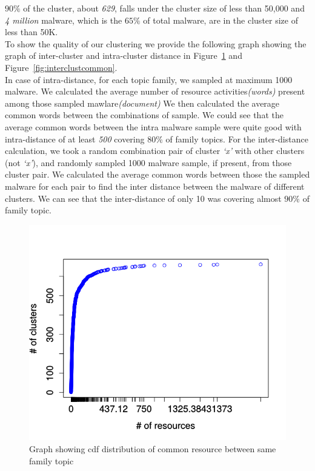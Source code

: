 $90\%$ of the cluster, about \emph{629}, falls under the cluster size of less than 50,000 and \emph{4 million} malware, which is the $65\%$ of total malware, are in the cluster size of less than 50K.\\
To show the quality of our clustering we provide the following graph showing the graph of inter-cluster and intra-cluster distance in Figure~\ref{fig:intraclustcommon} and Figure~\ref{fig:interclustcommon}.\\
In case of intra-distance, for each topic family, we sampled at maximum 1000 malware.
We calculated the average number of resource activities\textit{(words)} present among those sampled mawlare\textit{(document)}
We then calculated the average common words between the combinations of sample.
We could see that the average common words between the intra malware sample were quite good with intra-distance of at least \emph{500} covering $80\%$ of family topics.
For the inter-distance calculation, we took a random combination pair of cluster \emph{`x'} with other clusters (not \emph{`x'}), and randomly sampled 1000 malware sample, if present, from those cluster pair.
We calculated the average common words between those the sampled malware for each pair to find the inter distance between the malware of different clusters.
We can see that the inter-distance of only 10 was covering almost $90\%$ of family topic.
\begin{figure}[htbp]
\begin{center}
  \includegraphics[scale=0.7]{figures/intra_clustered_common.png}
\end{center}
\captionsetup{font=small}
\caption{ Graph showing cdf distribution of common resource between same family topic}
\label{fig:intraclustcommon}
\end{figure}
